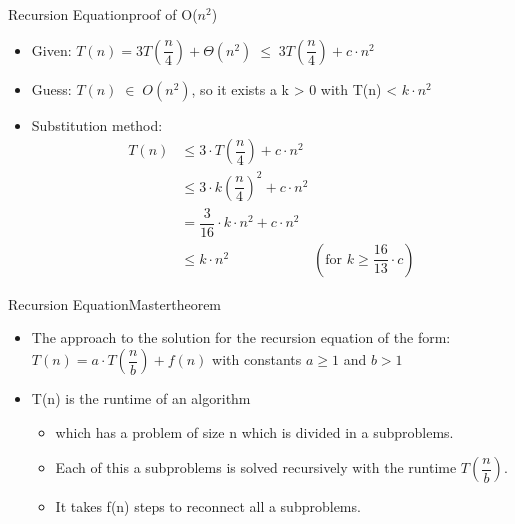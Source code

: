 
\begin{frame}{Recursion Equation}{proof of O($n^2$)}
	\begin{itemize}
		\item
			Given: $T(n) = 3T\left(\dfrac{n}{4}\right) + \Theta (n^2) \; \leq \; 
			3T \left( \dfrac{n}{4}\right) + c \cdot n^2$
		\item
			Guess: $T(n) \; \in \; O(n^2)$, so it exists a k > 0 with T(n) < $k \cdot 
			n^2$
		\item
			Substitution method:
			\begin{align*}
				T(n) & \leq 3 \cdot T \left( \dfrac{n}{4}\right)  + c \cdot n^2\\
				{} & \leq 3 \cdot k \left( \dfrac{n}{4}\right)^2  + c \cdot n^2\\
				{} & = \dfrac{3}{16} \cdot k \cdot n^2  + c \cdot n^2\\
				{} & \leq k \cdot n^2 \hspace{6em}(\text{for } k \geq \dfrac{16}{13} 
				\cdot c)
			\end{align*}
	\end{itemize}
\end{frame}


\begin{frame}{Recursion Equation}{Mastertheorem}
	\begin{itemize}
		\item
			The approach to the solution for the recursion equation of the form:\\
			$T(n) = a \cdot T\left(\dfrac{n}{b}\right) + f(n)$ with constants $a \geq 
			1$ and $b > 1$ \\\vspace{3em}
		\item
			T(n) is the runtime of an algorithm
			\begin{itemize}
				\item
					which has a problem of size n which is divided in a subproblems.
				\item
					Each of this a subproblems is solved recursively with the runtime 
					$T\left(\dfrac{n}{b}\right)$.
				\item
					It takes f(n) steps to reconnect all a subproblems.
			\end{itemize} 
	\end{itemize}
\end{frame}

